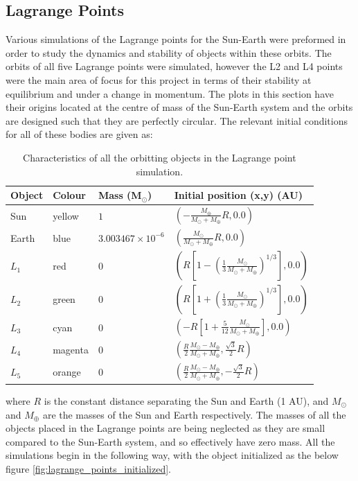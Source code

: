 \documentclass[10pt,letterpaper]{article}
\begin{document}
\subsection{Lagrange Points}
Various simulations of the Lagrange points for the Sun-Earth were preformed in order to study the dynamics and stability of objects within these orbits. The orbits of all five Lagrange points were simulated, however the L2 and L4 points were the main area of focus for this project in terms of their stability at equilibrium and under a change in momentum. The plots in this section have their origins located at the centre of mass of the Sun-Earth system and the orbits are designed such that they are perfectly circular. The relevant initial conditions for all of these bodies are given as: \\

\begin{table}[!htb]
\centering
\begin{tabular}{|l|l|l|l|}
\hline
Object	&	Colour		&	Mass (M$_\odot$)			&	Initial position (x,y) (AU)\\
\hline
Sun		&	yellow		&	$1$							&	$\left(-\frac{M_\oplus}{M_\odot+M_\oplus}R, 0.0\right)$ \\
\hline
Earth 	&	blue		&	$3.003467 \times 10^{-6}$	&	$\left(\frac{M_\odot}{M_\odot+M_\oplus}R, 0.0\right)$ \\ 
\hline
$L_1$	&	red			&	$0$							& 	$\left(R\left[1-\left(\frac{1}{3}\frac{M_\odot}{M_\odot+M_\oplus}\right)^{1/3}\right],0.0\right)$ \\
\hline
$L_2$	&	green		&	$0$							& 	$\left(R\left[1+\left(\frac{1}{3}\frac{M_\odot}{M_\odot+M_\oplus}\right)^{1/3}\right],0.0\right)$ \\
\hline
$L_3$	&	cyan		&	$0$							& 	$\left(-R\left[1+\frac{5}{12}\frac{M_\odot}{M_\odot+M_\oplus}\right],0.0\right)$ \\
\hline
$L_4$	&	magenta		&	$0$							& 	$\left(\frac{R}{2}\frac{M_\odot-M_\oplus}{M_\odot+M_\oplus},\frac{\sqrt{3}}{2}R\right)$ \\
\hline
$L_5$	&	orange		&	$0$							& 	$\left(\frac{R}{2}\frac{M_\odot-M_\oplus}{M_\odot+M_\oplus},-\frac{\sqrt{3}}{2}R\right)$ \\
\hline
\end{tabular}
\caption{Characteristics of all the orbitting objects in the Lagrange point simulation.}\label{tab:lagrange_points_characteristics}
\end{table}

where $R$ is the constant distance separating the Sun and Earth (1 AU), and $M_\odot$ and $M_\oplus$ are the masses of the Sun and Earth respectively. The masses of all the objects placed in the Lagrange points are being neglected as they are small compared to the Sun-Earth system, and so effectively have zero mass. All the simulations begin in the following way, with the object initialized as the below figure \ref{fig:lagrange_points_initialized}.
\end{document}
